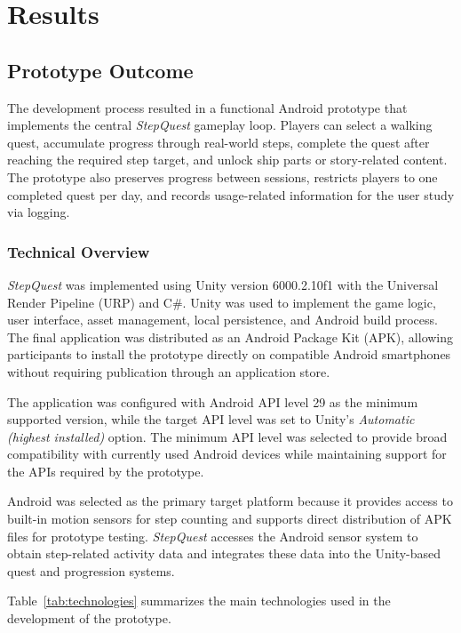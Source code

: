 \chapter{Results}

\section{Prototype Outcome}

The development process resulted in a functional Android prototype that implements the central \textit{StepQuest} gameplay loop. Players can select a walking quest, accumulate progress through real-world steps, complete the quest after reaching the required step target, and unlock ship parts or story-related content. The prototype also preserves progress between sessions, restricts players to one completed quest per day, and records usage-related information for the user study via logging.

\subsection{Technical Overview}

\textit{StepQuest} was implemented using Unity version 6000.2.10f1 with the Universal Render Pipeline (URP) and C\#. Unity was used to implement the game logic, user interface, asset management, local persistence, and Android build process. The final application was distributed as an Android Package Kit (APK), allowing participants to install the prototype directly on compatible Android smartphones without requiring publication through an application store.

The application was configured with Android API level 29 as the minimum supported version, while the target API level was set to Unity's \textit{Automatic (highest installed)} option. The minimum API level was selected to provide broad compatibility with currently used Android devices while maintaining support for the APIs required by the prototype.

Android was selected as the primary target platform because it provides access to built-in motion sensors for step counting and supports direct distribution of APK files for prototype testing. \textit{StepQuest} accesses the Android sensor system to obtain step-related activity data and integrates these data into the Unity-based quest and progression systems.

Table~\ref{tab:technologies} summarizes the main technologies used in the development of the prototype.

